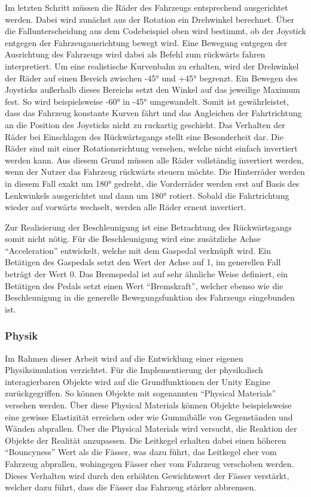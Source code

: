 	Im letzten Schritt müssen die Räder des Fahrzeugs entsprechend ausgerichtet werden. Dabei wird zunächst aus der Rotation ein Drehwinkel berechnet. Über die Fallunterscheidung aus dem Codebeispiel oben wird bestimmt, ob der Joystick entgegen der Fahrzeugausrichtung bewegt wird. Eine Bewegung entgegen der Ausrichtung des Fahrzeugs wird dabei als Befehl zum rückwärts fahren interpretiert. Um eine realistische Kurvenbahn zu erhalten, wird der Drehwinkel der Räder auf einen Bereich zwischen -45° und +45° begrenzt. Ein Bewegen des Joysticks außerhalb dieses Bereichs setzt den Winkel auf das jeweilige Maximum fest. So wird beispielsweise -60° in -45° umgewandelt. Somit ist gewährleistet, dass das Fahrzeug konstante Kurven fährt und das Angleichen der Fahrtrichtung an die Position des Joysticks nicht zu ruckartig geschieht. Das Verhalten der Räder bei Einschlagen des Rückwärtsgangs stellt eine Besonderheit dar. Die Räder sind mit einer Rotationsrichtung versehen, welche nicht einfach invertiert werden kann. Aus diesem Grund müssen alle Räder vollständig invertiert werden, wenn der Nutzer das Fahrzeug rückwärts steuern möchte. Die Hinterräder werden in diesem Fall exakt um 180° gedreht, die Vorderräder werden erst auf Basis des Lenkwinkels ausgerichtet und dann um 180° rotiert. Sobald die Fahrtrichtung wieder auf vorwärts wechselt, werden alle Räder erneut invertiert.

	Zur Realisierung der Beschleunigung ist eine Betrachtung des Rückwärtsgangs somit nicht nötig. Für die Beschleunigung wird eine zusätzliche Achse \enquote{Acceleration} entwickelt, welche mit dem Gaspedal verknüpft wird. Ein Betätigen des Gaspedals setzt den Wert der Achse auf 1, im generellen Fall beträgt der Wert 0. Das Bremspedal ist auf sehr ähnliche Weise definiert, ein Betätigen des Pedals setzt einen Wert \enquote{Bremskraft}, welcher ebenso wie die Beschleunigung in die generelle Bewegungsfunktion des Fahrzeugs eingebunden ist.


	\subsubsection{Physik}
	Im Rahmen dieser Arbeit wird auf die Entwicklung einer eigenen Physiksimulation verzichtet. Für die Implementierung der physikalisch interagierbaren Objekte wird auf die Grundfunktionen der Unity Engine zurückgegriffen. So können Objekte mit sogenannten \enquote{Physical Materials} versehen werden. Über diese Physical Materials können Objekte beispielsweise eine gewisse Elastizität erreichen oder wie Gummibälle von Gegenständen und Wänden abprallen. Über die Physical Materials wird versucht, die Reaktion der Objekte der Realität anzupassen. Die Leitkegel erhalten dabei einen höheren \enquote{Bouncyness} Wert als die Fässer, was dazu führt, das Leitkegel eher vom Fahrzeug abprallen, wohingegen Fässer eher vom Fahrzeug verschoben werden. Dieses Verhalten wird durch den erhöhten Gewichtswert der Fässer verstärkt, welcher dazu führt, dass die Fässer das Fahrzeug stärker abbremsen.


